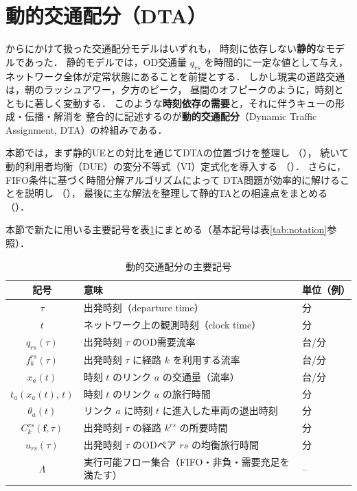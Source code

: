 
\section{動的交通配分（DTA）}
\label{sec:ch6-dta}

からにかけて扱った交通配分モデルはいずれも，
時刻に依存しない\textbf{静的}なモデルであった．
静的モデルでは，OD交通量 $q_{rs}$ を時間的に一定な値として与え，
ネットワーク全体が定常状態にあることを前提とする．
しかし現実の道路交通は，朝のラッシュアワー，夕方のピーク，
昼間のオフピークのように，時刻とともに著しく変動する．
このような\textbf{時刻依存の需要}と，それに伴うキューの形成・伝播・解消を
整合的に記述するのが\textbf{動的交通配分}（Dynamic Traffic Assignment, DTA）の枠組みである．

本節では，まず静的UEとの対比を通じてDTAの位置づけを整理し
（），
続いて動的利用者均衡（DUE）の変分不等式（VI）定式化を導入する
（）．
さらに，FIFO条件に基づく時間分解アルゴリズムによって
DTA問題が効率的に解けることを説明し
（），
最後に主な解法を整理して静的TAとの相違点をまとめる
（）\cite{Friesz1993,KuwaharaAkamatsu2001}．

本節で新たに用いる主要記号を表\ref{tab:ch6-notation}にまとめる（基本記号は表\ref{tab:notation}参照）．

\begin{table}[hbtp]
  \centering
  \caption{動的交通配分の主要記号}
  \label{tab:ch6-notation}
  \begin{tabular}{cll}
    \toprule
    記号 & 意味 & 単位（例） \\
    \midrule
    $\tau$              & 出発時刻（departure time） & 分 \\
    $t$                 & ネットワーク上の観測時刻（clock time） & 分 \\
    $q_{rs}(\tau)$      & 出発時刻 $\tau$ のOD需要流率 & 台/分 \\
    $f_k^{rs}(\tau)$    & 出発時刻 $\tau$ に経路 $k$ を利用する流率 & 台/分 \\
    $x_a(t)$            & 時刻 $t$ のリンク $a$ の交通量（流率） & 台/分 \\
    $t_a(x_a(t),\,t)$   & 時刻 $t$ のリンク $a$ の旅行時間 & 分 \\
    $\theta_a(t)$        & リンク $a$ に時刻 $t$ に進入した車両の退出時刻 & 分 \\
    $C_k^{rs}(\boldsymbol{f},\tau)$ & 出発時刻 $\tau$ の経路 $k^{rs}$ の所要時間 & 分 \\
    $u_{rs}(\tau)$       & 出発時刻 $\tau$ のODペア $rs$ の均衡旅行時間 & 分 \\
    $\Lambda$            & 実行可能フロー集合（FIFO・非負・需要充足を満たす） & -- \\
    \bottomrule
  \end{tabular}
\end{table}

